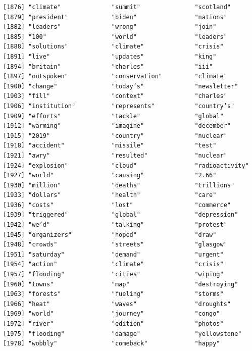 \documentclass[
  letterpaper,
  DIV=11,
  numbers=noendperiod]{scrartcl}
\begin{document}
\begin{verbatim}
[1876] "climate"              "summit"               "scotland"            
[1879] "president"            "biden"                "nations"             
[1882] "leaders"              "wrong"                "join"                
[1885] "100"                  "world"                "leaders"             
[1888] "solutions"            "climate"              "crisis"              
[1891] "live"                 "updates"              "king"                
[1894] "britain"              "charles"              "iii"                 
[1897] "outspoken"            "conservation"         "climate"             
[1900] "change"               "today’s"              "newsletter"          
[1903] "fill"                 "context"              "charles"             
[1906] "institution"          "represents"           "country’s"           
[1909] "efforts"              "tackle"               "global"              
[1912] "warming"              "imagine"              "december"            
[1915] "2019"                 "country"              "nuclear"             
[1918] "accident"             "missile"              "test"                
[1921] "awry"                 "resulted"             "nuclear"             
[1924] "explosion"            "cloud"                "radioactivity"       
[1927] "world"                "causing"              "2.66"                
[1930] "million"              "deaths"               "trillions"           
[1933] "dollars"              "health"               "care"                
[1936] "costs"                "lost"                 "commerce"            
[1939] "triggered"            "global"               "depression"          
[1942] "we’d"                 "talking"              "protest"             
[1945] "organizers"           "hoped"                "draw"                
[1948] "crowds"               "streets"              "glasgow"             
[1951] "saturday"             "demand"               "urgent"              
[1954] "action"               "climate"              "crisis"              
[1957] "flooding"             "cities"               "wiping"              
[1960] "towns"                "map"                  "destroying"          
[1963] "forests"              "fueling"              "storms"              
[1966] "heat"                 "waves"                "droughts"            
[1969] "world"                "journey"              "congo"               
[1972] "river"                "edition"              "photos"              
[1975] "flooding"             "damage"               "yellowstone"         
[1978] "wobbly"               "comeback"             "happy"               

\end{verbatim}
\end{document}
